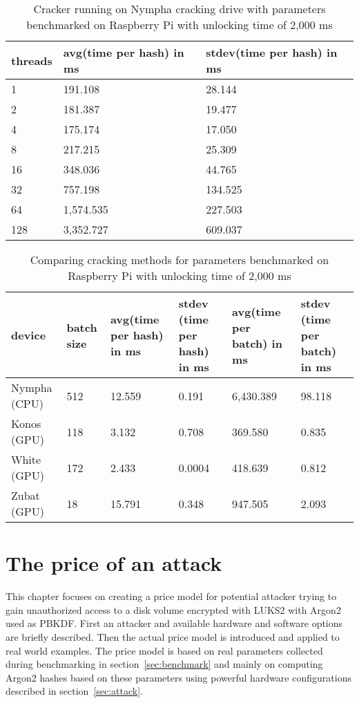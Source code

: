 \documentclass[nolof]{fithesis3}
\begin{document}
\noindent
\begin{table}
\caption{Cracker running on Nympha cracking drive with parameters benchmarked on Raspberry Pi with unlocking time of 2,000 ms}
\label{tab:nymphacrackerrpi}
\begin{tabularx}{\textwidth}{| X | X | X |}
\hline
threads & avg(time per hash) in ms & stdev(time per hash) in ms\\
\hline
1 & 191.108 & 28.144\\
\hline
2 & 181.387 & 19.477\\
\hline
4 & 175.174 & 17.050\\
\hline
8 & 217.215 & 25.309\\
\hline
16 & 348.036 & 44.765\\
\hline
32 & 757.198 & 134.525\\
\hline
64 & 1,574.535 & 227.503\\
\hline
128 & 3,352.727 & 609.037\\
\hline
\end{tabularx}
\end{table}

\noindent
\begin{table}
\caption{Comparing cracking methods for parameters benchmarked on Raspberry Pi with unlocking time of 2,000 ms}
\label{tab:rpicrack}
\begin{tabularx}{\textwidth}{| X | X | X | X | X | X |}
\hline
device & batch size & avg(time per hash) in ms & stdev (time per hash) in ms & avg(time per batch) in ms & stdev (time per batch) in ms\\
\hline
Nympha (CPU) & 512 & 12.559 & 0.191 & 6,430.389 & 98.118\\
\hline
Konos (GPU) & 118 & 3.132 & 0.708 & 369.580 & 0.835\\
\hline
White (GPU) & 172 & 2.433 & 0.0004 & 418.639 & 0.812\\
\hline
Zubat (GPU) & 18 & 15.791 & 0.348 & 947.505 & 2.093\\
\hline
\end{tabularx}
\end{table}

\chapter{The price of an attack}
\label{chap:model}
This chapter focuses on creating a price model for potential attacker trying to gain unauthorized access to a disk volume encrypted with LUKS2 with Argon2 used as PBKDF. First an attacker and available hardware and software options are briefly described. Then the actual price model is introduced and applied to real world examples. The price model is based on real parameters collected during benchmarking in section~\ref{sec:benchmark} and mainly on computing Argon2 hashes based on these parameters using powerful hardware configurations described in section~\ref{sec:attack}.
\end{document}
